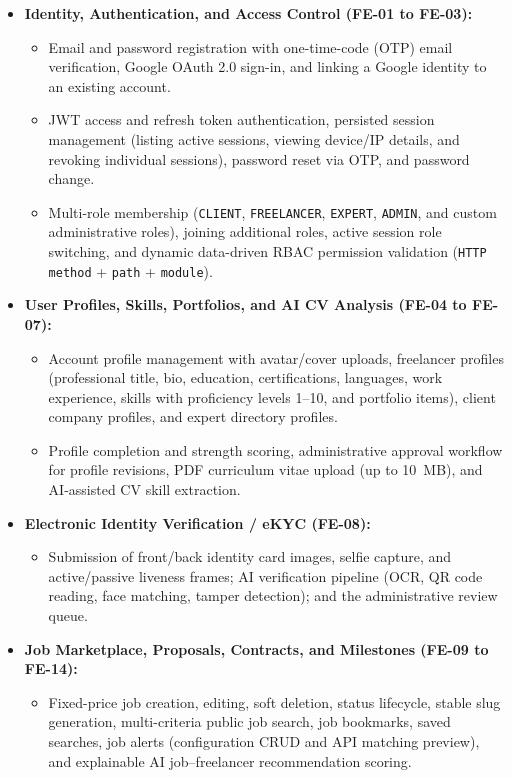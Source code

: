 \documentclass[12pt,a4paper]{article}
\begin{document}
\begin{itemize}
  \item \textbf{Identity, Authentication, and Access Control (FE-01 to FE-03):}
  \begin{itemize}
    \item Email and password registration with one-time-code (OTP) email verification, Google OAuth 2.0 sign-in, and linking a Google identity to an existing account.
    \item JWT access and refresh token authentication, persisted session management (listing active sessions, viewing device/IP details, and revoking individual sessions), password reset via OTP, and password change.
    \item Multi-role membership (\texttt{CLIENT}, \texttt{FREELANCER}, \texttt{EXPERT}, \texttt{ADMIN}, and custom administrative roles), joining additional roles, active session role switching, and dynamic data-driven RBAC permission validation (\texttt{HTTP method} + \texttt{path} + \texttt{module}).
  \end{itemize}
  \item \textbf{User Profiles, Skills, Portfolios, and AI CV Analysis (FE-04 to FE-07):}
  \begin{itemize}
    \item Account profile management with avatar/cover uploads, freelancer profiles (professional title, bio, education, certifications, languages, work experience, skills with proficiency levels 1--10, and portfolio items), client company profiles, and expert directory profiles.
    \item Profile completion and strength scoring, administrative approval workflow for profile revisions, PDF curriculum vitae upload (up to 10~MB), and AI-assisted CV skill extraction.
  \end{itemize}
  \item \textbf{Electronic Identity Verification / eKYC (FE-08):}
  \begin{itemize}
    \item Submission of front/back identity card images, selfie capture, and active/passive liveness frames; AI verification pipeline (OCR, QR code reading, face matching, tamper detection); and the administrative review queue.
  \end{itemize}
  \item \textbf{Job Marketplace, Proposals, Contracts, and Milestones (FE-09 to FE-14):}
  \begin{itemize}
    \item Fixed-price job creation, editing, soft deletion, status lifecycle, stable slug generation, multi-criteria public job search, job bookmarks, saved searches, job alerts (configuration CRUD and API matching preview), and explainable AI job--freelancer recommendation scoring.

\end{itemize}
\end{itemize}
\end{document}
